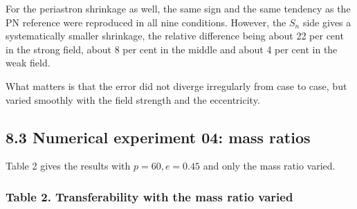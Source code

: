 \documentclass[
  a4paper,
]{article}
\begin{document}
For the periastron shrinkage as well, the same sign and the same
tendency as the PN reference were reproduced in all nine conditions.
However, the \(S_n\) side gives a systematically smaller shrinkage, the
relative difference being about 22 per cent in the strong field, about 8
per cent in the middle and about 4 per cent in the weak field.

What matters is that the error did not diverge irregularly from case to
case, but varied smoothly with the field strength and the eccentricity.

\subsection{8.3 Numerical experiment 04: mass
ratios}\label{numerical-experiment-04-mass-ratios}

Table 2 gives the results with \(p=60,e=0.45\) and only the mass ratio
varied.

\subsubsection{Table 2. Transferability with the mass ratio
varied}\label{table-2.-transferability-with-the-mass-ratio-varied}
\end{document}
